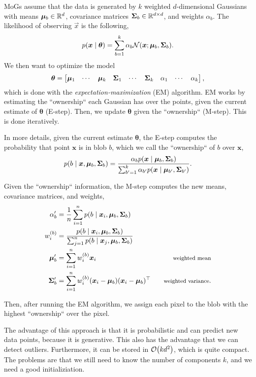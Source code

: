 MoGs assume that the data is generated by $k$ weighted $d$-dimensional
Gaussians with means $\bm{\mu}_b\in\mathbb{R}^d$, covariance matrices
$\bm{\Sigma}_b\in\mathbb{R}^{d\times d}$, and weights $\alpha_b$. The likelihood of
observing $\vec{x}$ is the following, \[
  p(\bm{x}\mid\bm{\theta}) = \sum_{b=1}^k \alpha_b \mathcal{N}(\bm{x}; \bm{\mu}_b,\bm{\Sigma}_b)
.\]
We then want to optimize the model \wrt \[
  \bm{\theta} = \begin{bmatrix} \bm{\mu}_1 & \cdots & \bm{\mu}_k & \bm{\Sigma}_1 & \cdots & \bm{\Sigma}_k & \alpha_1 & \cdots & \alpha_k \end{bmatrix}
,\]
which is done with the \textit{expectation-maximization} (EM) algorithm. EM
works by estimating the ``ownership`` each Gaussian has over the points, given
the current estimate of $\bm{\theta}$ (E-step). Then, we update $\bm{\theta}$
given the ``ownership`` (M-step). This is done iteratively.

In more details, given the current estimate $\bm{\theta}$, the E-step
computes the probability that point $\bm{x}$ is in blob $b$, which we call
the ``ownership`` of $b$ over $\bm{x}$, \[
  p(b\mid \bm{x},\bm{\mu}_b,\bm{\Sigma}_b) = \frac{\alpha_b p(\bm{x}\mid \bm{\mu}_b,\bm{\Sigma}_b)}{\sum_{b'=1}^k \alpha_{b'}p(\bm{x}\mid\bm{\mu}_{b'},\bm{\Sigma}_{b'})}
.\]

Given the ``ownership`` information, the M-step computes the new means,
covariance matrices, and weights,
\begin{align*}
  \alpha_b' &= \frac{1}{n} \sum_{i=1}^n p(b\mid \vec{x}_i,\vec{\mu}_b,\mat{\Sigma}_b) \\
  w^{(b)}_i &= \frac{p(b\mid \vec{x}_i,\vec{\mu}_b,\mat{\Sigma}_b)}{\sum_{j=1}^n p(b\mid \vec{x}_j,\vec{\mu}_b,\mat{\Sigma}_b)} \\
  \vec{\mu}_b' &= \sum_{i=1}^n w^{(b)}_i\vec{x}_i & \text{\footnotesize weighted mean} \\
  \mat{\Sigma}_b' &= \sum_{i=1}^n w^{(b)}_i (\vec{x}_i - \vec{\mu}_b) (\vec{x}_i - \vec{\mu}_b)^\top & \text{\footnotesize weighted variance}
.\end{align*}

Then, after running the EM algorithm, we assign each pixel to the blob with
the highest ``ownership`` over the pixel.

The advantage of this approach is that it is probabilistic and can predict new
data points, because it is generative. This also has the advantage that we can
detect outliers. Furthermore, it can be stored in $\bigo{kd^2}$, which is quite
compact. The problems are that we still need to know the number of components
$k$, and we need a good initializiation.

